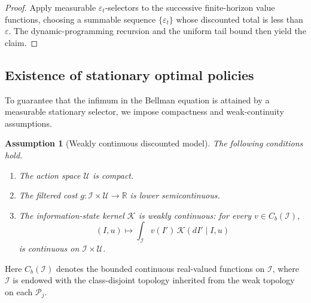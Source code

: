 \documentclass[10pt,twocolumn]{article}
\newtheorem{assumption}{Assumption}
\theoremstyle{remark}
\newcommand{\R}{\mathbb{R}}
\newcommand{\Pcal}{\mathcal{P}}
\newcommand{\Ucal}{\mathcal{U}}
\newcommand{\Ical}{\mathcal{I}}
\begin{document}
\begin{proof}
	Apply measurable \(\varepsilon_t\)-selectors to the successive finite-horizon value functions, choosing a summable sequence \(\{\varepsilon_t\}\) whose discounted total is less than \(\varepsilon\). The dynamic-programming recursion and the uniform tail bound then yield the claim.
\end{proof}

\subsection{Existence of stationary optimal policies}
\label{subsec:stationary-optimal-policies}

To guarantee that the infimum in the Bellman equation is attained by a measurable stationary selector, we impose compactness and weak-continuity assumptions.

\begin{assumption}[Weakly continuous discounted model]
	\label{ass:weakly-continuous-model}
	The following conditions hold.
	\begin{enumerate}[label=\textnormal{(W\arabic*)},leftmargin=*]
		\item The action space \(\Ucal\) is compact.
		\item The filtered cost \(g:\Ical\times\Ucal\to\R\) is lower semicontinuous.
		\item The information-state kernel \(\mathcal K\) is weakly continuous: for every \(v\in C_b(\Ical)\),
		\begin{equation*}
			(I,u)\longmapsto
			\int_{\Ical}v(I')\,
			\mathcal K(dI'\mid I,u)
			\label{eq:weak-continuity-kernel}
		\end{equation*}
		is continuous on \(\Ical\times\Ucal\).
	\end{enumerate}
\end{assumption}

Here \(C_b(\Ical)\) denotes the bounded continuous real-valued functions on \(\Ical\), where \(\Ical\) is endowed with the class-disjoint topology inherited from the weak topology on each \(\Pcal_j\).
\end{document}
